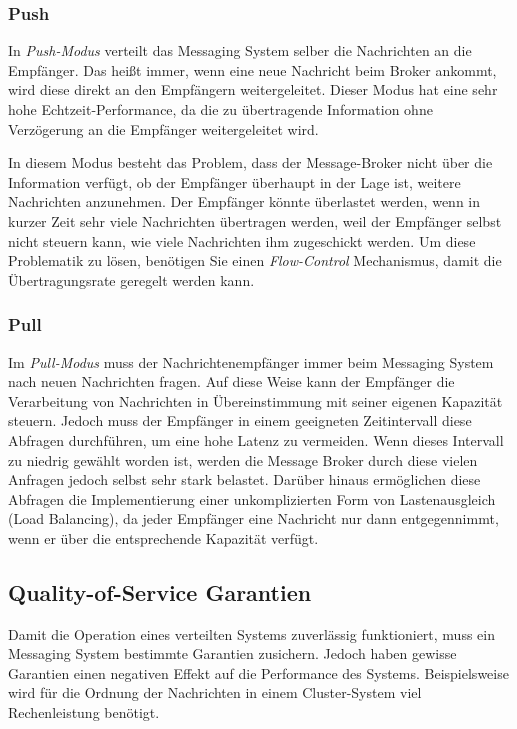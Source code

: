 \subsubsection{Push}

In \emph{Push-Modus} verteilt das Messaging System selber die Nachrichten an die Empfänger. Das heißt immer, wenn eine neue Nachricht beim Broker ankommt, wird diese direkt an den Empfängern weitergeleitet. Dieser Modus hat eine sehr hohe Echtzeit-Performance, da die zu übertragende Information ohne Verzögerung an die Empfänger weitergeleitet wird.

In diesem Modus besteht das Problem, dass der Message-Broker nicht über die Information verfügt, ob der Empfänger überhaupt in der Lage ist, weitere Nachrichten anzunehmen. Der Empfänger könnte überlastet werden, wenn in kurzer Zeit sehr viele Nachrichten übertragen werden, weil der Empfänger selbst nicht steuern kann, wie viele Nachrichten ihm zugeschickt werden. Um diese Problematik zu lösen, benötigen Sie einen \emph{Flow-Control} Mechanismus, damit die Übertragungsrate geregelt werden kann.  
\cite{curryMessageOrientedMiddleware2004,fuFairComparisonMessage2021}

\subsubsection{Pull}

Im \emph{Pull-Modus} muss der Nachrichtenempfänger immer beim Messaging System nach neuen Nachrichten fragen. Auf diese Weise kann der Empfänger die Verarbeitung von Nachrichten in Übereinstimmung mit seiner eigenen Kapazität steuern. Jedoch muss der Empfänger in einem geeigneten Zeitintervall diese Abfragen durchführen, um eine hohe Latenz zu vermeiden. Wenn dieses Intervall zu niedrig gewählt worden ist, werden die Message Broker durch diese vielen Anfragen jedoch selbst sehr stark belastet. Darüber hinaus ermöglichen diese Abfragen die Implementierung einer unkomplizierten Form von Lastenausgleich (Load Balancing), da jeder Empfänger eine Nachricht nur dann entgegennimmt, wenn er über die entsprechende Kapazität verfügt. \cite{curryMessageOrientedMiddleware2004,fuFairComparisonMessage2021}

\subsection{Quality-of-Service Garantien}

Damit die Operation eines verteilten Systems zuverlässig funktioniert, muss ein Messaging System bestimmte Garantien zusichern. Jedoch haben gewisse Garantien einen negativen Effekt auf die Performance des Systems. Beispielsweise wird für die Ordnung der Nachrichten in einem Cluster-System viel Rechenleistung benötigt. 
\cite{fuFairComparisonMessage2021}

